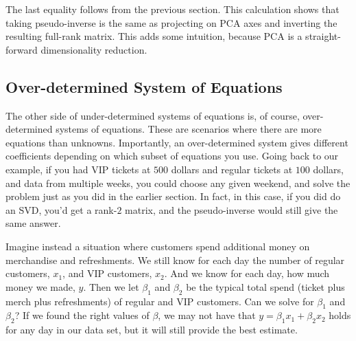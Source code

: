 \documentclass{amsbook}
\begin{document}
The last equality follows from the previous section.  This calculation shows that taking pseudo-inverse is the same as projecting on PCA axes and inverting the resulting full-rank matrix.  This adds some intuition, because PCA is a straight-forward dimensionality reduction.

\subsection{Over-determined System of Equations}

The other side of under-determined systems of equations is, of course, over-determined systems of equations.  These are scenarios where there are more equations than unknowns.  Importantly, an over-determined system gives different coefficients depending on which subset of equations you use.  Going back to our example, if you had VIP tickets at $500$ dollars and regular tickets at $100$ dollars, and data from multiple weeks, you could choose any given weekend, and solve the problem just as you did in the earlier section.  In fact, in this case, if you did do an SVD, you'd get a rank-$2$ matrix, and the pseudo-inverse would still give the same answer.

Imagine instead a situation where customers spend additional money on merchandise and refreshments.  We still know for each day the number of regular customers, $x_1$, and VIP customers, $x_2$.  And we know for each day, how much money we made, $y$.  Then we let $\beta_1$ and $\beta_2$ be the typical total spend (ticket plus merch plus refreshments) of regular and VIP customers.  Can we solve for $\beta_1$ and $\beta_2$?  If we found the right values of $\beta$, we may not have that $y=\beta_1x_1+\beta_2x_2$ holds for any day in our data set, but it will still provide the best estimate.
\end{document}
